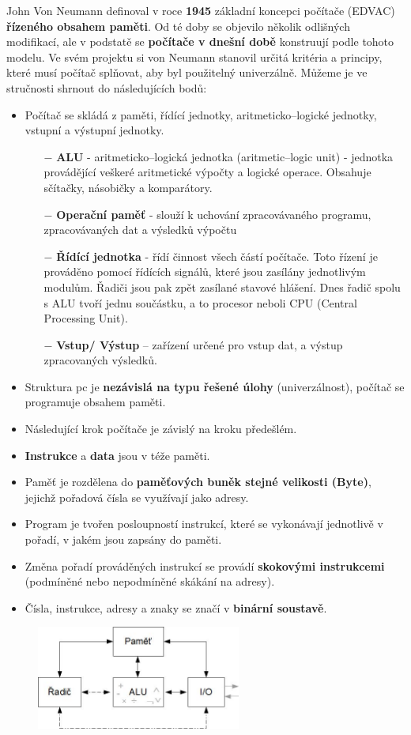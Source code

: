 John Von Neumann definoval v roce \textbf{1945} základní koncepci počítače (EDVAC) \textbf{řízeného obsahem paměti}. Od té doby se objevilo několik odlišných modifikací, ale v podstatě se \textbf{počítače v dnešní době} konstruují podle tohoto modelu. Ve svém projektu si von Neumann stanovil určitá kritéria a principy, které musí počítač splňovat, aby byl použitelný univerzálně. Můžeme je ve stručnosti shrnout do následujících bodů:
\begin{itemize}
\item Počítač se skládá z paměti, řídící jednotky, aritmeticko--logické jednotky, vstupní a  výstupní jednotky.
\begin{itemize}
\item[$-$] \textbf{ALU} - aritmeticko--logická jednotka (aritmetic--logic unit) - jednotka provádějící veškeré aritmetické výpočty a logické operace. Obsahuje sčítačky, násobičky a komparátory.
\item[$-$] \textbf{Operační paměť} - slouží k uchování zpracovávaného programu, zpracovávaných dat a výsledků výpočtu
\item[$-$] \textbf{Řídící jednotka} - řídí činnost všech částí počítače. Toto řízení je prováděno pomocí řídících signálů, které jsou zasílány jednotlivým modulům. Řadiči jsou pak zpět zasílané stavové hlášení. Dnes řadič spolu s ALU tvoří jednu součástku, a to procesor neboli CPU (Central Processing Unit).
\item[$-$] \textbf{Vstup/ Výstup} – zařízení určené pro vstup dat, a výstup zpracovaných výsledků.
\end{itemize}
\item Struktura pc je \textbf{nezávislá na typu řešené úlohy} (univerzálnost), počítač se programuje obsahem paměti.
\item Následující krok počítače je závislý na kroku předešlém.
\item \textbf{Instrukce} a \textbf{data} jsou v téže paměti.
\item Paměť je rozdělena do \textbf{paměťových buněk stejné velikosti (Byte)}, jejichž pořadová čísla se využívají jako adresy.
\item Program je tvořen posloupností instrukcí, které se vykonávají jednotlivě v pořadí, v jakém jsou zapsány do paměti.
\item Změna pořadí prováděných instrukcí se provádí \textbf{skokovými instrukcemi} (podmíněné nebo nepodmíněné skákání na adresy). 
\item Čísla, instrukce, adresy a znaky se značí v \textbf{binární soustavě}.
\end{itemize}
\begin{figure}[H]
\centering
\includegraphics[width=0.6\textwidth]{assets/1_vonNeumann}
\end{figure}

